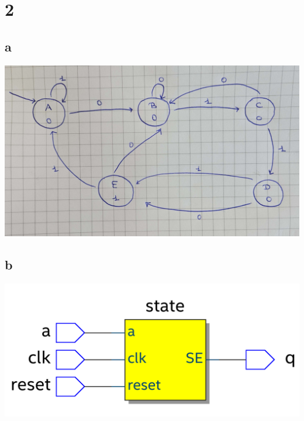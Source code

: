 \documentclass{article}
\begin{document}
\section*{2}
\subsection*{a}
\includegraphics*[width=\textwidth]{q2a}
\subsection*{b}
\includegraphics*[width=\textwidth]{q2b}
\end{document}
